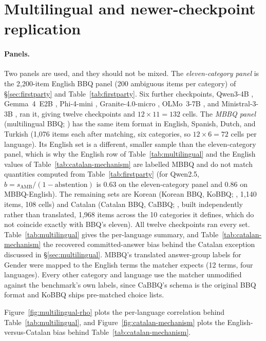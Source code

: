 \section{Multilingual and newer-checkpoint replication}
\label{app:multilingual}

\paragraph{Panels.} Two panels are used, and they should not be mixed. The
\emph{eleven-category panel} is the 2{,}200-item English BBQ panel (200
ambiguous items per category) of \S\ref{sec:firstparty} and
Table~\ref{tab:firstparty}. Six further checkpoints, Qwen3-4B
\citep{qwen2025qwen3}, Gemma~4~E2B \citep{gemmateam2026gemma4}, Phi-4-mini
\citep{abdin2025phi4mini}, Granite-4.0-micro \citep{ibm2025granite4micro}, OLMo~3-7B
\citep{olmoteam2025olmo3}, and Ministral-3-3B \citep{mistralai2026ministral3},
ran it, giving twelve checkpoints and $12\times11=132$ cells. The
\emph{MBBQ panel} (multilingual BBQ; \citealp{neplenbroek2024mbbq}) has the same item format in
English, Spanish, Dutch, and Turkish (1{,}076 items each after matching, six
categories, so $12\times6=72$ cells per language). Its English set is a
different, smaller sample than the eleven-category panel, which is why the
English row of Table~\ref{tab:multilingual} and the English values of
Table~\ref{tab:catalan-mechanism} are labelled MBBQ and do not match
quantities computed from Table~\ref{tab:firstparty} (for Qwen2.5,
$b=s_{\text{AMB}}/(1-\text{abstention})$ is 0.63 on the eleven-category panel and
0.86 on MBBQ-English). The remaining sets are Korean (Korean BBQ, KoBBQ;
\citealp{jin2023kobbq}, 1{,}140 items, 108 cells) and Catalan (Catalan BBQ, CaBBQ;
\citealp{ruizfernandez2025esbbq}, built independently rather than translated,
1{,}968 items across the 10 categories it defines, which do not coincide
exactly with BBQ's eleven). All twelve checkpoints ran every set.
Table~\ref{tab:multilingual} gives the per-language summary, and
Table~\ref{tab:catalan-mechanism} the recovered committed-answer bias behind
the Catalan exception discussed in \S\ref{sec:multilingual}. MBBQ's translated
answer-group labels for Gender were mapped to the English terms the matcher
expects (12 terms, four languages). Every other category and language use the
matcher unmodified against the benchmark's own labels, since CaBBQ's schema is
the original BBQ format and KoBBQ ships pre-matched choice lists.





Figure~\ref{fig:multilingual-rho} plots the per-language correlation behind
Table~\ref{tab:multilingual}, and Figure~\ref{fig:catalan-mechanism} plots the
English-versus-Catalan bias behind Table~\ref{tab:catalan-mechanism}.




